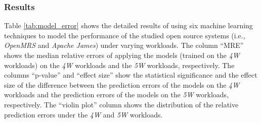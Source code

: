 \subsubsection*{Results}
Table \ref{tab:model_error} shows the detailed results of using six machine learning techniques to model the performance of the studied open source systems (i.e., \emph{OpenMRS} and \emph{Apache James}) under varying workloads.
 The column ``MRE'' shows the  median relative errors of applying the models (trained on the \emph{4W} workloads) on the \emph{4W} workloads and the \emph{5W} workloads, respectively. 
  The columns ``p-value'' and ``effect size'' show the statistical significance and the effect size of the difference between the prediction errors of the models on the \emph{4W} workloads and the prediction errors of the models on the \emph{5W} workloads, respectively. The ``violin plot'' column shows the distribution of the relative prediction errors under the \emph{4W} and \emph{5W} workloads.

